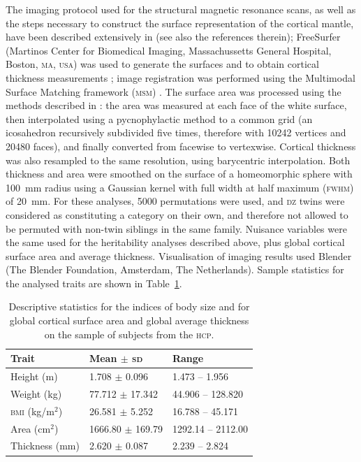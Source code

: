 The imaging protocol used for the structural magnetic resonance scans, as well as the steps necessary to construct the surface representation of the cortical mantle, have been described extensively in \citet{Glasser2013} (see also the references therein); FreeSurfer (Martinos Center for Biomedical Imaging, Massachussetts General Hospital, Boston, \textsc{ma}, \textsc{usa}) was used to generate the surfaces and to obtain cortical thickness measurements \citep{Dale1999, Fischl1999, Fischl2000}; image registration was performed using the Multimodal Surface Matching framework (\textsc{msm}) \citep{Robinson2014}. The surface area was processed using the methods described in \citet{Winkler2012}: the area was measured at each face of the white surface, then interpolated using a pycnophylactic method to a common grid (an icosahedron recursively subdivided five times, therefore with 10242 vertices and 20480 faces), and finally converted from facewise to vertexwise. Cortical thickness was also resampled to the same resolution, using barycentric interpolation. Both thickness and area were smoothed on the surface of a homeomorphic sphere with 100~mm radius using a Gaussian kernel with full width at half maximum (\textsc{fwhm}) of 20~mm. For these analyses, 5000 permutations were used, and \textsc{dz} twins were considered as constituting a category on their own, and therefore not allowed to be permuted with non-twin siblings in the same family. Nuisance variables were the same used for the heritability analyses described above, plus global cortical surface area and average thickness. Visualisation of imaging results used Blender (The Blender Foundation, Amsterdam, The Netherlands). Sample statistics for the analysed traits are shown in Table~\ref{tab:samplestats}.

\begin{table}[!tp]
\caption[Descriptive statistics for the relevant measurements from the \textsc{hcp} subjects.]{Descriptive statistics for the indices of body size and for global cortical surface area and global average thickness on the sample of subjects from the \textsc{hcp}.}
{\small
\begin{center}
\begin{tabular}{@{}lll@{}}
\toprule
Trait & Mean $\pm$ \textsc{sd} & Range\\
\midrule
Height (m) & 1.708 $\pm$ 0.096 & 1.473 -- 1.956\\
Weight (kg) & 77.712 $\pm$ 17.342 & 44.906 -- 128.820\\
\textsc{bmi} (kg/m$^2$) & 26.581 $\pm$ 5.252 & 16.788 -- 45.171\\
Area (cm$^2$) & 1666.80 $\pm$ 169.79 & 1292.14 -- 2112.00\\
Thickness (mm) & 2.620 $\pm$ 0.087 & 2.239 -- 2.824\\
\bottomrule   
\end{tabular}
\end{center}}
\label{tab:samplestats}
\end{table}

